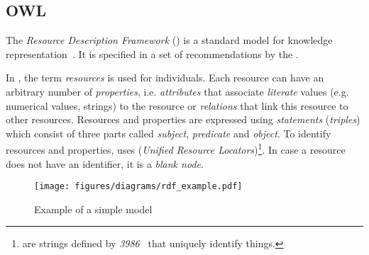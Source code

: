 \subsection{OWL}
\label{subsec:owl}

The \emph{Resource Description Framework} () is a standard model for knowledge representation~\cite{RDF}. It is specified in a set of recommendations by the .

In , the term \emph{resources} is used for individuals. Each resource can have an arbitrary number of \emph{properties}, i.e. \emph{attributes} that associate \emph{literate} values (e.g. numerical values, strings) to the resource or \emph{relations} that link this resource to other resources. Resources and properties are expressed using \emph{statements} (\emph{triples}) which consist of three parts called \emph{subject}, \emph{predicate} and \emph{object}. To identify resources and properties,  uses  (\emph{Unified Resource Locators})\footnote{ are strings defined by \emph{ 3986}~\cite{rfc3986} that uniquely identify things.}. In case a resource does not have an identifier, it is a \emph{blank node}.

\begin{figure}
\centering
\texttt{[image: figures/diagrams/rdf\_example.pdf]}
\caption{Example of a simple  model}
\label{fig:rdf_example}
\end{figure}

